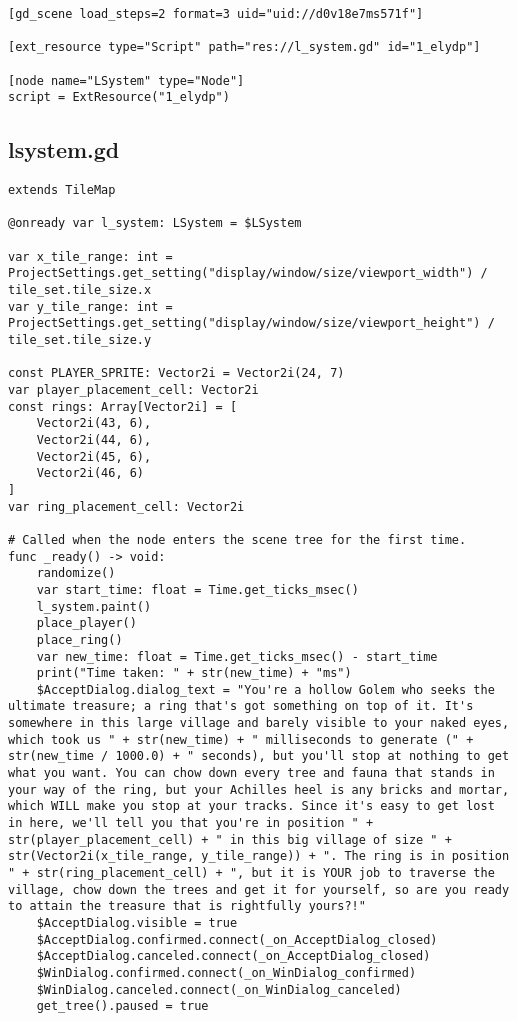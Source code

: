 \begin{lstlisting}
[gd_scene load_steps=2 format=3 uid="uid://d0v18e7ms571f"]

[ext_resource type="Script" path="res://l_system.gd" id="1_elydp"]

[node name="LSystem" type="Node"]
script = ExtResource("1_elydp")
\end{lstlisting}

\subsection{l\textunderscore{}system.gd}

\begin{lstlisting}
extends TileMap

@onready var l_system: LSystem = $LSystem

var x_tile_range: int = ProjectSettings.get_setting("display/window/size/viewport_width") / tile_set.tile_size.x
var y_tile_range: int = ProjectSettings.get_setting("display/window/size/viewport_height") / tile_set.tile_size.y

const PLAYER_SPRITE: Vector2i = Vector2i(24, 7)
var player_placement_cell: Vector2i
const rings: Array[Vector2i] = [
	Vector2i(43, 6),
	Vector2i(44, 6),
	Vector2i(45, 6),
	Vector2i(46, 6)
]
var ring_placement_cell: Vector2i

# Called when the node enters the scene tree for the first time.
func _ready() -> void:
	randomize()
	var start_time: float = Time.get_ticks_msec()
	l_system.paint()
	place_player()
	place_ring()
	var new_time: float = Time.get_ticks_msec() - start_time
	print("Time taken: " + str(new_time) + "ms")
	$AcceptDialog.dialog_text = "You're a hollow Golem who seeks the ultimate treasure; a ring that's got something on top of it. It's somewhere in this large village and barely visible to your naked eyes, which took us " + str(new_time) + " milliseconds to generate (" + str(new_time / 1000.0) + " seconds), but you'll stop at nothing to get what you want. You can chow down every tree and fauna that stands in your way of the ring, but your Achilles heel is any bricks and mortar, which WILL make you stop at your tracks. Since it's easy to get lost in here, we'll tell you that you're in position " + str(player_placement_cell) + " in this big village of size " + str(Vector2i(x_tile_range, y_tile_range)) + ". The ring is in position " + str(ring_placement_cell) + ", but it is YOUR job to traverse the village, chow down the trees and get it for yourself, so are you ready to attain the treasure that is rightfully yours?!"
	$AcceptDialog.visible = true
	$AcceptDialog.confirmed.connect(_on_AcceptDialog_closed)
	$AcceptDialog.canceled.connect(_on_AcceptDialog_closed)
	$WinDialog.confirmed.connect(_on_WinDialog_confirmed)
	$WinDialog.canceled.connect(_on_WinDialog_canceled)
	get_tree().paused = true


\end{lstlisting}
